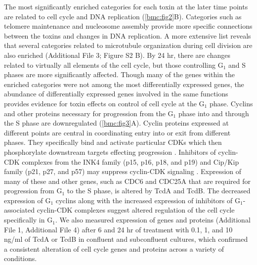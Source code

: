The most significantly enriched categories for each toxin at the later time points are related to cell cycle and DNA replication (\autoref{bmc:fig2}B). Categories such as telomere maintenance and nucleosome assembly provide more specific connections between the toxins and changes in DNA replication. A more extensive list reveals that several categories related to microtubule organization during cell division are also enriched (Additional File 3; Figure S2 B). By 24 hr, there are changes related to virtually all elements of the cell cycle, but those controlling G$_{\text{1}}$ and S phases are more significantly affected. Though many of the genes within the enriched categories were not among the most differentially expressed genes, the abundance of differentially expressed genes involved in the same functions provides evidence for toxin effects on control of cell cycle at the G$_{\text{1}}$ phase. Cyclins and other proteins necessary for progression from the G$_{\text{1}}$ phase into and through the S phase are downregulated (\autoref{bmc:fig3}A). Cyclin proteins expressed at different points are central in coordinating entry into or exit from different phases. They specifically bind and activate particular CDKs which then phosphorylate downstream targets effecting progression \cite{Murray:2004ge}. Inhibitors of cyclin-CDK complexes from the INK4 family (p15, p16, p18, and p19) and Cip/Kip family (p21, p27, and p57) may suppress cyclin-CDK signaling \cite{Denicourt:2004bw}. Expression of many of these and other genes, such as CDC6 and CDC25A that are required for progression from G$_{\text{1}}$ to the S phase, is altered by TcdA and TcdB. The decreased expression of G$_{\text{1}}$ cyclins along with the increased expression of inhibitors of G$_{\text{1}}$-associated cyclin-CDK complexes suggest altered regulation of the cell cycle specifically in G$_{\text{1}}$. We also measured expression of genes and proteins (Additional File 1, Additional File 4) after 6 and 24 hr of treatment with 0.1, 1, and 10 ng/ml of TcdA or TcdB in confluent and subconfluent cultures, which confirmed a consistent alteration of cell cycle genes and proteins across a variety of conditions.

